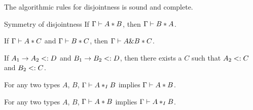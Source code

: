The algorithmic rules for disjointness is sound and complete.

\begin{lemma}{Symmetry of disjointness} \label{symmetry-of-disjointness}
  If $\Gamma \vdash A * B$, then $\Gamma \vdash B * A$.
\end{lemma}

\begin{theorem} \label{disjoint-intersect}
  If $\Gamma \vdash A * C$ and $\Gamma \vdash B * C$,
  then $\Gamma \vdash A \& B * C$.
\end{theorem}

\begin{lemma} \label{common-supertype}
  If $A_1 \to A_2 <: D$ and $B_1 \to B_2 <: D$,
  then there exists a $C$ such that $A_2 <: C$ and $B_2 <: C$.
\end{lemma}

\begin{theorem}[Soundness]
  For any two types $A$, $B$, $\Gamma \vdash A *_I B$ implies $\Gamma \vdash A * B$.
\end{theorem}

\begin{theorem}[Completeness]
  For any two types $A$, $B$, $\Gamma \vdash A * B$ implies $\Gamma \vdash A *_I B$.
\end{theorem}
